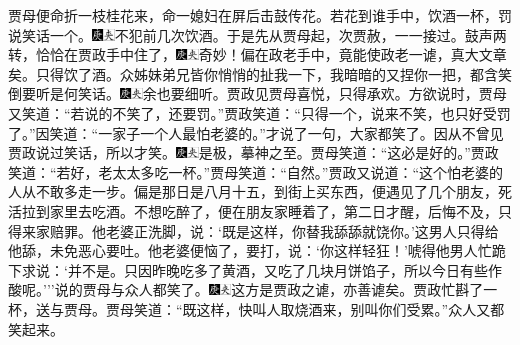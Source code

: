 贾母便命折一枝桂花来，命一媳妇在屏后击鼓传花。若花到谁手中，饮酒一杯，罚说笑话一个。{\includegraphics[width=3mm]{../Images/00004}\includegraphics[width=3mm]{../Images/00012}\footnotesize \kaishu 不犯前几次饮酒。}于是先从贾母起，次贾赦，一一接过。鼓声两转，恰恰在贾政手中住了，{\includegraphics[width=3mm]{../Images/00004}\includegraphics[width=3mm]{../Images/00012}\footnotesize \kaishu 奇妙！偏在政老手中，竟能使政老一谑，真大文章矣。}只得饮了酒。众姊妹弟兄皆你悄悄的扯我一下，我暗暗的又捏你一把，都含笑倒要听是何笑话。{\includegraphics[width=3mm]{../Images/00004}\includegraphics[width=3mm]{../Images/00012}\footnotesize \kaishu 余也要细听。}贾政见贾母喜悦，只得承欢。方欲说时，贾母又笑道：``若说的不笑了，还要罚。''贾政笑道：``只得一个，说来不笑，也只好受罚了。''因笑道：``一家子一个人最怕老婆的。''才说了一句，大家都笑了。因从不曾见贾政说过笑话，所以才笑。{\includegraphics[width=3mm]{../Images/00004}\includegraphics[width=3mm]{../Images/00012}\footnotesize \kaishu 是极，摹神之至。}贾母笑道：``这必是好的。''贾政笑道：``若好，老太太多吃一杯。''贾母笑道：``自然。''贾政又说道：``这个怕老婆的人从不敢多走一步。偏是那日是八月十五，到街上买东西，便遇见了几个朋友，死活拉到家里去吃酒。不想吃醉了，便在朋友家睡着了，第二日才醒，后悔不及，只得来家赔罪。他老婆正洗脚，说：`既是这样，你替我舔舔就饶你。'这男人只得给他舔，未免恶心要吐。他老婆便恼了，要打，说：`你这样轻狂！'唬得他男人忙跪下求说：`并不是。只因昨晚吃多了黄酒，又吃了几块月饼馅子，所以今日有些作酸呢。'''说的贾母与众人都笑了。{\includegraphics[width=3mm]{../Images/00004}\includegraphics[width=3mm]{../Images/00012}\footnotesize \kaishu 这方是贾政之谑，亦善谑矣。}贾政忙斟了一杯，送与贾母。贾母笑道：``既这样，快叫人取烧酒来，别叫你们受累。''众人又都笑起来。

